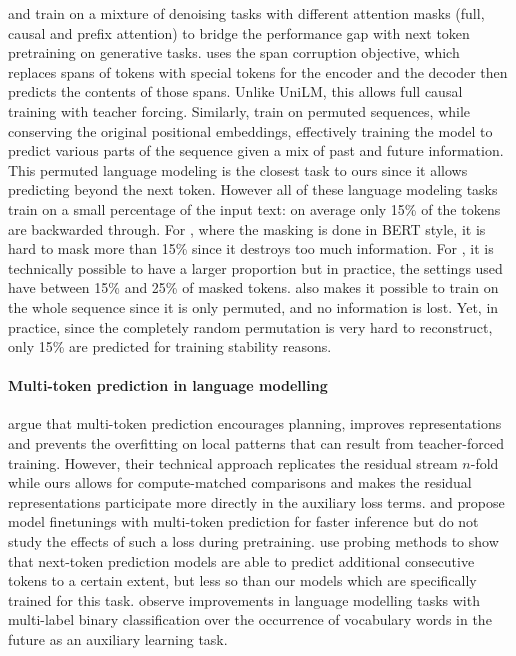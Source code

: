 \documentclass{article}
\theoremstyle{plain}
\theoremstyle{definition}
\theoremstyle{remark}
\begin{document}
\citet{dong2019unified} and \citet{tay2022ul2} train on a mixture of denoising tasks with different attention masks (full, causal and prefix attention) to bridge the performance gap with next token pretraining on generative tasks. \citet{tay2022ul2} uses the span corruption objective, which replaces spans of tokens with special tokens for the encoder and the decoder then predicts the contents of those spans. Unlike UniLM, this allows full causal training with teacher forcing. Similarly, \citet{yang2019xlnet} train on permuted sequences, while conserving the original positional embeddings, effectively training the model to predict various parts of the sequence given a mix of past and future information. This permuted language modeling is the closest task to ours since it allows predicting beyond the next token. However all of these language modeling tasks train on a small percentage of the input text: on average only 15\% of the tokens are backwarded through. For \citet{dong2019unified}, where the masking is done in BERT style, it is hard to mask more than 15\% since it destroys too much information. For \citet{tay2022ul2}, it is technically possible to have a larger proportion but in practice, the settings used have between 15\% and 25\% of masked tokens. \cite{yang2019xlnet} also makes it possible to train on the whole sequence since it is only permuted, and no information is lost. Yet, in practice, since the completely random permutation is very hard to reconstruct, only 15\% are predicted for training stability reasons. 

\paragraph{Multi-token prediction in language modelling}
\citet{qi2020prophetnet} argue that multi-token prediction encourages planning, improves representations and prevents the overfitting on local patterns that can result from teacher-forced training. However, their technical approach replicates the residual stream $n$-fold while ours allows for compute-matched comparisons and makes the residual representations participate more directly in the auxiliary loss terms. \citet{stern2018blockwise} and \citet{cai2024medusa} propose model finetunings with multi-token prediction for faster inference but do not study the effects of such a loss during pretraining. \citet{pal2023future} use probing methods to show that next-token prediction models are able to predict additional consecutive tokens to a certain extent, but less so than our models which are specifically trained for this task.
\citet{jianyu_leon} observe improvements in language modelling tasks with multi-label binary classification over the occurrence of vocabulary words in the future as an auxiliary learning task.
\end{document}
